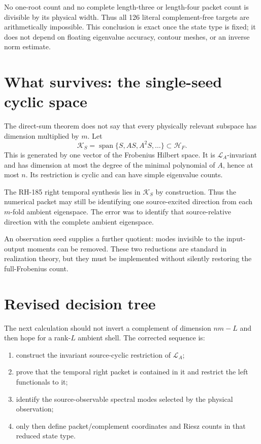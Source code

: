 \documentclass[12pt]{article}
\theoremstyle{remark}
\newcommand{\cH}{\mathcal H}
\newcommand{\cK}{\mathcal K}
\newcommand{\cL}{\mathcal L}
\begin{document}
No one-root count and no complete length-three or length-four packet count
is divisible by its physical width.  Thus all 126 literal complement-free
targets are arithmetically impossible.  This conclusion is exact once the
state type is fixed; it does not depend on floating eigenvalue accuracy,
contour meshes, or an inverse norm estimate.

\section{What survives: the single-seed cyclic space}

The direct-sum theorem does not say that every physically relevant
subspace has dimension multiplied by $m$.  Let
\begin{equation}\label{eq:cyclic-space}
 \cK_S=\operatorname{span}\{S,AS,A^2S,\ldots\}\subset\cH_F.
\end{equation}
This is generated by one vector of the Frobenius Hilbert space.  It is
$\cL_A$-invariant and has dimension at most the degree of the minimal
polynomial of $A$, hence at most $n$.  Its restriction is cyclic and can have
simple eigenvalue counts.

The RH-185 right temporal synthesis lies in $\cK_S$ by construction.  Thus
the numerical packet may still be identifying one source-excited direction
from each $m$-fold ambient eigenspace.  The error was to identify that
source-relative direction with the complete ambient eigenspace.

An observation seed supplies a further quotient: modes invisible to the
input-output moments can be removed.  These two reductions are standard in
realization theory, but they must be implemented without silently restoring
the full-Frobenius count.

\section{Revised decision tree}

The next calculation should not invert a complement of dimension $nm-L$
and then hope for a rank-$L$ ambient shell.  The corrected sequence is:
\begin{enumerate}[leftmargin=2em]
\item construct the invariant source-cyclic restriction of $\cL_A$;
\item prove that the temporal right packet is contained in it and restrict
 the left functionals to it;
\item identify the source-observable spectral modes selected by the
 physical observation;
\item only then define packet/complement coordinates and Riesz counts in
 that reduced state type.
\end{enumerate}
\end{document}
